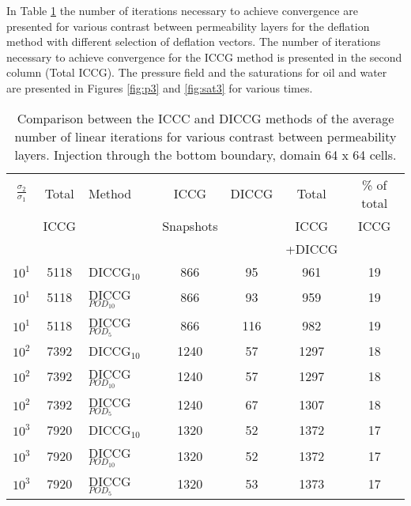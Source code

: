 \documentclass[12pt]{article}
\begin{document}
In Table \ref{table:liter3} the number of iterations necessary to achieve convergence are presented for various contrast between permeability layers for the deflation method with different selection of deflation vectors. The number of iterations necessary to achieve convergence for the ICCG method is presented in the second column (Total ICCG). 
The pressure field and the saturations for oil and water are presented in Figures \ref{fig:p3} and \ref{fig:sat3} for various times.
\begin{table}[!h]\centering
\begin{minipage}{1\textwidth}
 \centering
\begin{tabular}{ ||c|c||l|c|c|c|c||} 
\hline
$\frac{\sigma_2}{\sigma_1}$&Total&Method  & ICCG&DICCG &Total&\% of total\\ 
                           & ICCG     &  & Snapshots& &ICCG& ICCG\\ 
                            &     &  & & &+DICCG& \\
\hline 
$10^{1}$ &5118& DICCG$_{10}$&866&95&961&19\\ 
\hline  
$10^{1}$ &5118& DICCG$_{POD_{10}}$&866&93&959&19 \\ 
\hline  
$10^{1}$ &5118& DICCG$_{POD_{5}}$&866&116&982&19 \\ 
\hline 
$10^{2}$ &7392& DICCG$_{10}$&1240&57&1297&18\\ 
\hline  
$10^{2}$ &7392& DICCG$_{POD_{10}}$&1240&57&1297&18 \\ 
\hline  
$10^{2}$ &7392& DICCG$_{POD_{5}}$&1240&67&1307&18 \\ 
\hline 
$10^{3}$ &7920& DICCG$_{10}$&1320&52&1372&17\\ 
\hline  
$10^{3}$ &7920& DICCG$_{POD_{10}}$&1320&52&1372&17 \\ 
\hline  
$10^{3}$ &7920& DICCG$_{POD_{5}}$&1320&53&1373&17 \\ 
\hline  
\end{tabular} 
\caption{Comparison between the ICCC and DICCG methods of the average number of linear iterations for various contrast between permeability layers. Injection through the bottom boundary, domain 64 x 64 cells.}\label{table:liter3} 
\end{minipage}  
\end{table}  
% 
\end{document}
